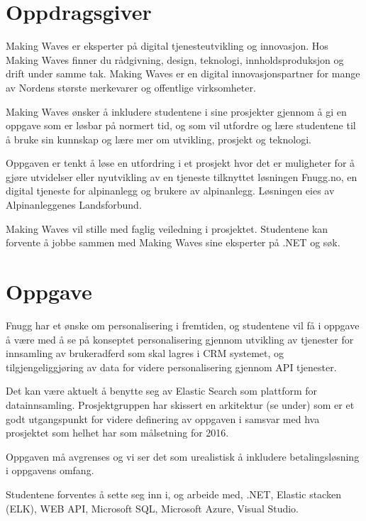 \section{Oppdragsgiver}
Making Waves er eksperter på digital tjenesteutvikling og innovasjon. Hos Making Waves finner du rådgivning, design, teknologi, innholdsproduksjon og drift under samme tak. Making Waves er en digital innovasjonspartner for mange av Nordens største merkevarer og offentlige virksomheter.

Making Waves ønsker å inkludere studentene i sine prosjekter gjennom å gi en oppgave som er løsbar på normert tid, og som vil utfordre og lære studentene til å bruke sin kunnskap og lære mer om utvikling, prosjekt og teknologi.

Oppgaven er tenkt å løse en utfordring i et prosjekt hvor det er muligheter for å gjøre utvidelser eller nyutvikling av en tjeneste tilknyttet løsningen Fnugg.no, en digital tjeneste for alpinanlegg og brukere av alpinanlegg. Løsningen eies av Alpinanleggenes Landsforbund.

Making Waves vil stille med faglig veiledning i prosjektet. Studentene kan forvente å jobbe sammen med Making Waves sine eksperter på .NET og søk.

\section{Oppgave}
Fnugg har et ønske om personalisering i fremtiden, og studentene vil få i oppgave å være med å se på konseptet personalisering gjennom utvikling av tjenester for innsamling av brukeradferd som skal lagres i CRM systemet, og tilgjengeliggjøring av data for videre personalisering gjennom API tjenester.

Det kan være aktuelt å benytte seg av Elastic Search som plattform for datainnsamling. Prosjektgruppen har skissert en arkitektur (se under) som er et godt utgangspunkt for videre definering av oppgaven i samsvar med hva prosjektet som helhet har som målsetning for 2016.

Oppgaven må avgrenses og vi ser det som urealistisk å inkludere betalingsløsning i oppgavens omfang.

Studentene forventes å sette seg inn i, og arbeide med, .NET, Elastic stacken (ELK), WEB API, Microsoft SQL, Microsoft Azure, Visual Studio.

